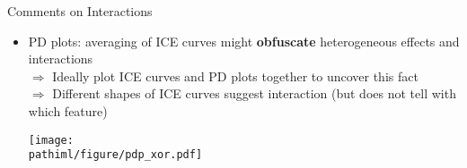 \documentclass[11pt,compress,t,notes=noshow, aspectratio=169, xcolor=table]{beamer}
\newcommand{\pathiml}{../../slides/03_feature-effects/}
\begin{document}
%
%

\begin{frame}{Comments on Interactions}
\begin{itemize}

\item PD plots: averaging of ICE curves might \textbf{obfuscate} heterogeneous effects and interactions \\ 
\(\Rightarrow\) Ideally plot ICE curves and PD plots together to uncover this fact\\
\(\Rightarrow\) Different shapes of ICE curves suggest interaction (but does not tell with which  feature)

\begin{center}\texttt{[image: \\pathiml/figure/pdp\_xor.pdf]} \end{center}
\end{itemize}

\end{frame}
\end{document}
